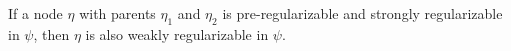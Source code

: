 If a node $\eta$ with parents $\eta_1$ and $\eta_2$ is pre-regularizable and strongly regularizable in $\psi$, then $\eta$ is also weakly regularizable in $\psi$.








